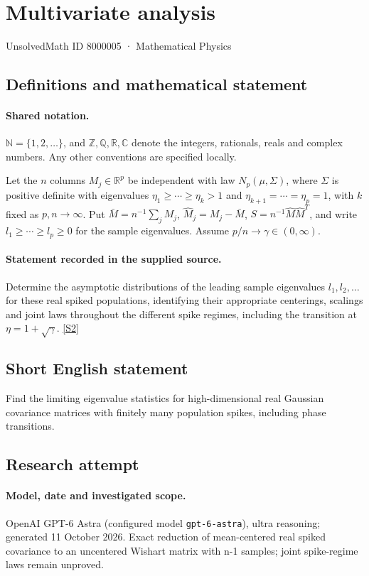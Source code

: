\documentclass[11pt]{article}
\newcommand{\sref}[2]{\hyperlink{source:#1:#2}{[S#2]}}
\begin{document}
\setcounter{section}{8000004}
\section{Multivariate analysis}\label{8000005}
{\small\sffamily UnsolvedMath ID 8000005 · Mathematical Physics}
\subsection{Definitions and mathematical statement}

\paragraph{Shared notation.}$\mathbb N=\{1,2,\ldots\}$, and $\mathbb Z,\mathbb Q,\mathbb R,\mathbb C$ denote the integers, rationals, reals and complex numbers. Any other conventions are specified locally.


Let the $n$ columns $M_j\in\mathbb R^p$ be independent with law $N_p(\mu,\Sigma)$, where $\Sigma$ is positive definite with eigenvalues $\eta_1\ge\cdots\ge\eta_k>1$ and $\eta_{k+1}=\cdots=\eta_p=1$, with $k$ fixed as $p,n\to\infty$. Put $\bar M=n^{-1}\sum_j M_j$, $\widehat M_j=M_j-\bar M$, $S=n^{-1}\widehat M\widehat M^T$, and write $l_1\ge\cdots\ge l_p\ge0$ for the sample eigenvalues. Assume $p/n\to\gamma\in(0,\infty)$.
\paragraph{Statement recorded in the supplied source.}
Determine the asymptotic distributions of the leading sample eigenvalues $l_1,l_2,\ldots$ for these real spiked populations, identifying their appropriate centerings, scalings and joint laws throughout the different spike regimes, including the transition at $\eta=1+\sqrt\gamma$. \sref{8000005}{2}
\subsection{Short English statement}
Find the limiting eigenvalue statistics for high-dimensional real Gaussian covariance matrices with finitely many population spikes, including phase transitions.
\subsection{Research attempt}
\paragraph{Model, date and investigated scope.}
OpenAI GPT-6 Astra (configured model \texttt{gpt-6-astra}), ultra reasoning; generated 11 October 2026. Exact reduction of mean-centered real spiked covariance to an uncentered Wishart matrix with n-1 samples; joint spike-regime laws remain unproved.
\end{document}

